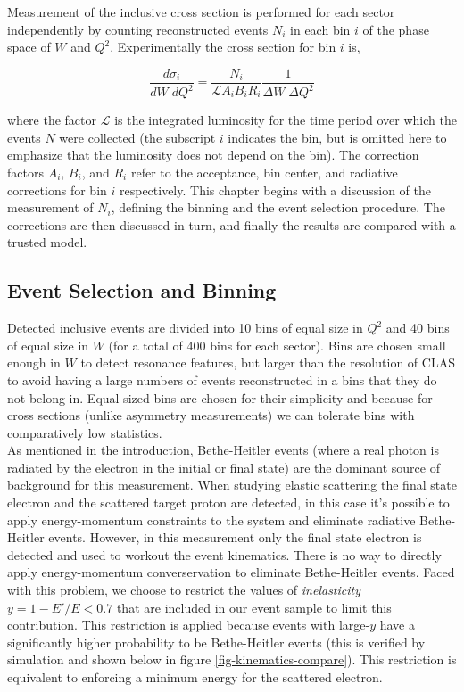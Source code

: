 Measurement of the inclusive cross section is performed for each sector independently by counting reconstructed events $N_i$ in each bin $i$ of the phase space of $W$ and $Q^2$.  Experimentally the cross section for bin $i$ is, 

\begin{equation}
	\frac{d\sigma_i}{dW \; dQ^2} = \frac{N_i}{\mathcal{L} A_i B_i R_i} \frac{1}{\Delta W \; \Delta Q^2}
\end{equation}

where the factor $\mathcal{L}$ is the integrated luminosity for the time period over which the events $N$ were collected (the subscript $i$ indicates the bin, but is omitted here to emphasize that the luminosity does not depend on the bin).  The correction factors $A_i$, $B_i$, and $R_i$ refer to the acceptance, bin center, and radiative corrections for bin $i$ respectively.  This chapter begins with a discussion of the measurement of $N_i$, defining the binning and the event selection procedure.  The corrections are then discussed in turn, and finally the results are compared with a trusted model.  

\subsection{Event Selection and Binning}
Detected inclusive events are divided into 10 bins of equal size in $Q^2$ and 40 bins of equal size in $W$ (for a total of 400 bins for each sector).  Bins are chosen small enough in $W$ to detect resonance features, but larger than the resolution of CLAS to avoid having a large numbers of events reconstructed in a bins that they do not belong in.  Equal sized bins are chosen for their simplicity and because for cross sections (unlike asymmetry measurements) we can tolerate bins with comparatively low statistics. \\

As mentioned in the introduction, Bethe-Heitler events (where a real photon is radiated by the electron in the initial or final state) are the dominant source of background for this measurement.  When studying elastic scattering the final state electron and the scattered target proton are detected, in this case it's possible to apply energy-momentum constraints to the system and eliminate radiative Bethe-Heitler events.  However, in this measurement only the final state electron is detected and used to workout the event kinematics.  There is no way to directly apply energy-momentum converservation to eliminate Bethe-Heitler events.  Faced with this problem, we choose to restrict the values of \textit{inelasticity} $y = 1-E'/E < 0.7$ that are included in our event sample to limit this contribution.  This restriction is applied because events with large-$y$ have a significantly higher probability to be Bethe-Heitler events (this is verified by simulation and shown below in figure \ref{fig-kinematics-compare}).  This restriction is equivalent to enforcing a minimum energy for the scattered electron.


